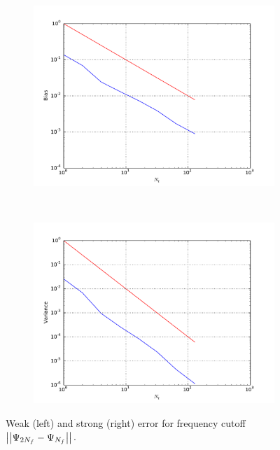 \documentclass[11pt]{amsart}
\begin{document}
\begin{figure}
    \centering
    \begin{subfigure}[b]{0.4\textwidth}
        \includegraphics[width=\textwidth]{weakerr3.pdf}
    \end{subfigure}
    ~ %
    \begin{subfigure}[b]{0.4\textwidth}
        \includegraphics[width=\textwidth]{strongerr3.pdf}
    \end{subfigure}
    \caption{\label{img:rateFig3} Weak (left) and strong (right) error
    for frequency cutoff
    $\left| {\left| {{\Psi_{2N_f}-\Psi_{N_f}}} \right|} \right|_{}$.}
\end{figure}
\end{document}
